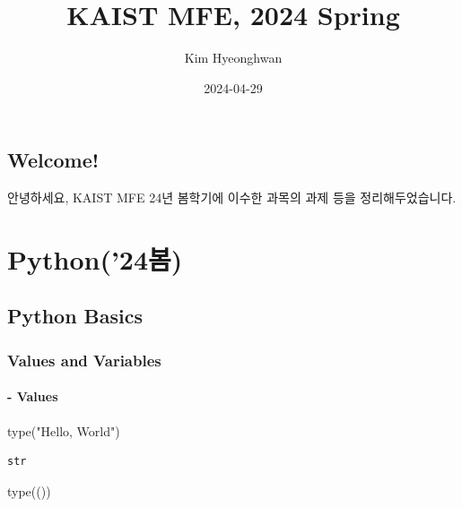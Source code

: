 \documentclass[
  letterpaper,
  DIV=11,
  numbers=noendperiod]{scrreprt}
\title{KAIST MFE, 2024 Spring}
\author{Kim Hyeonghwan}
\date{2024-04-29}
\newenvironment{Shaded}{\begin{snugshade}}{\end{snugshade}}
\newcommand{\BuiltInTok}[1]{\textcolor[rgb]{0.00,0.23,0.31}{#1}}
\newcommand{\NormalTok}[1]{\textcolor[rgb]{0.00,0.23,0.31}{#1}}
\newcommand{\StringTok}[1]{\textcolor[rgb]{0.13,0.47,0.30}{#1}}
\renewcommand*\contentsname{Table of contents}
\newcommand\contentsname{Table of contents}
\begin{document}
\maketitle

\renewcommand*\contentsname{Table of contents}
{
\hypersetup{linkcolor=}
\setcounter{tocdepth}{2}
\tableofcontents
}

\chapter*{Welcome!}\label{welcome}


안녕하세요, KAIST MFE 24년 봄학기에 이수한 과목의 과제 등을
정리해두었습니다.

\part{Python('24봄)}

\chapter{Python Basics}\label{python-basics}

\section{Values and Variables}\label{values-and-variables}

\subsection{- Values}\label{values}

\begin{Shaded}
\begin{Highlighting}[]
\BuiltInTok{type}\NormalTok{(}\StringTok{"Hello, World"}\NormalTok{)}
\end{Highlighting}
\end{Shaded}

\begin{verbatim}
str
\end{verbatim}

\begin{Shaded}
\begin{Highlighting}[]
\BuiltInTok{type}\NormalTok{(())}
\end{Highlighting}
\end{Shaded}
\end{document}

